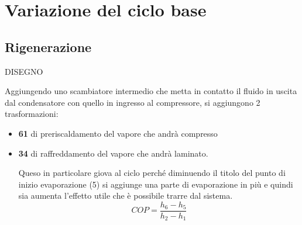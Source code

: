 \section{Variazione del ciclo base}
\subsection{Rigenerazione}
\begin{adjustwidth}{2in}{}
	
	DISEGNO
	
	Aggiungendo uno scambiatore intermedio che metta in contatto il fluido in uscita dal condensatore con quello in ingresso al compressore, si aggiungono 2 trasformazioni:
	\begin{itemize}
		\item \textbf{61} di preriscaldamento del vapore che andrà compresso
		\item \textbf{34} di raffreddamento del vapore che andrà laminato. 
		
		Queso in particolare giova al ciclo perché diminuendo il titolo del punto di inizio evaporazione (5) si aggiunge una parte di evaporazione in più e quindi sia aumenta l'effetto utile che è possibile trarre dal sistema. 
		\[COP = \dfrac{h_6-h_5}{h_2-h_1}\]
	\end{itemize} 
\end{adjustwidth}

